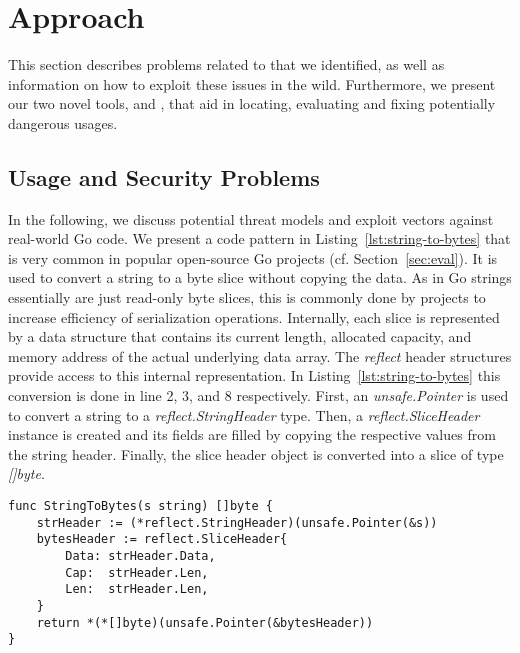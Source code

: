 \section{Approach}
\label{sec:appr}

This section describes problems related to \unsafe{} that we identified, as well as information on how to exploit these issues in the wild.
Furthermore, we present our two novel tools, \toolUsage{} and \toolSA{}, that aid in locating, evaluating and fixing potentially dangerous \unsafe{} usages.



\subsection{Usage and Security Problems}
\label{sec:appr:vulnerabilites}

In the following, we discuss potential threat models and exploit vectors against real-world \unsafe{} Go code.
We present a code pattern in Listing~\ref{lst:string-to-bytes} that is very common in popular open-source Go projects (cf. Section~\ref{sec:eval}).
It is used to convert a string to a byte slice without copying the data.
As in Go strings essentially are just read-only byte slices, this is commonly done by projects to increase efficiency of serialization operations. %
Internally, each slice is represented by a data structure that contains its current length, allocated capacity, and memory address of the actual underlying data array.
The \textit{reflect} header structures provide access to this internal representation.
In Listing~\ref{lst:string-to-bytes} this conversion is done in line 2, 3, and 8 respectively.
First, an \textit{unsafe.Pointer} is used to convert a string to a \textit{reflect.StringHeader} type.
Then, a \textit{reflect.SliceHeader} instance is created and its fields are filled by copying the respective values from the string header.
Finally, the slice header object is converted into a slice of type \textit{[]byte}.

\begin{lstlisting}[language=Golang, label=lst:string-to-bytes, caption=Conversion from string to bytes using \unsafe{}, float, belowskip=-1.5em]
func StringToBytes(s string) []byte {
	strHeader := (*reflect.StringHeader)(unsafe.Pointer(&s))
	bytesHeader := reflect.SliceHeader{
		Data: strHeader.Data,
		Cap:  strHeader.Len,
		Len:  strHeader.Len,
	}
	return *(*[]byte)(unsafe.Pointer(&bytesHeader))
}
\end{lstlisting}


